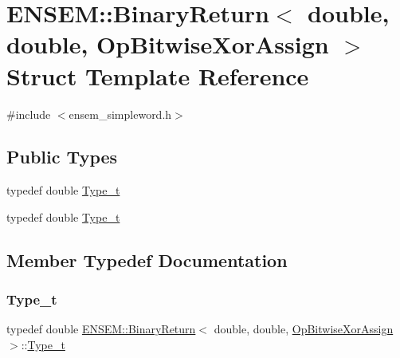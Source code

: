 \hypertarget{structENSEM_1_1BinaryReturn_3_01double_00_01double_00_01OpBitwiseXorAssign_01_4}{}\section{E\+N\+S\+EM\+:\+:Binary\+Return$<$ double, double, Op\+Bitwise\+Xor\+Assign $>$ Struct Template Reference}
\label{structENSEM_1_1BinaryReturn_3_01double_00_01double_00_01OpBitwiseXorAssign_01_4}


{\ttfamily \#include $<$ensem\+\_\+simpleword.\+h$>$}

\subsection*{Public Types}
\begin{DoxyCompactItemize}
\item 
typedef double \mbox{\hyperlink{structENSEM_1_1BinaryReturn_3_01double_00_01double_00_01OpBitwiseXorAssign_01_4_abd2a3f0619e394d328f98f130fc26e87}{Type\+\_\+t}}
\item 
typedef double \mbox{\hyperlink{structENSEM_1_1BinaryReturn_3_01double_00_01double_00_01OpBitwiseXorAssign_01_4_abd2a3f0619e394d328f98f130fc26e87}{Type\+\_\+t}}
\end{DoxyCompactItemize}


\subsection{Member Typedef Documentation}
\mbox{\label{structENSEM_1_1BinaryReturn_3_01double_00_01double_00_01OpBitwiseXorAssign_01_4_abd2a3f0619e394d328f98f130fc26e87}} 
\subsubsection{\texorpdfstring{Type\_t}{Type\_t}\hspace{0.1cm}{\footnotesize\ttfamily [1/2]}}
{\footnotesize\ttfamily typedef double \mbox{\hyperlink{structENSEM_1_1BinaryReturn}{E\+N\+S\+E\+M\+::\+Binary\+Return}}$<$ double, double, \mbox{\hyperlink{structENSEM_1_1OpBitwiseXorAssign}{Op\+Bitwise\+Xor\+Assign}} $>$\+::\mbox{\hyperlink{structENSEM_1_1BinaryReturn_3_01double_00_01double_00_01OpBitwiseXorAssign_01_4_abd2a3f0619e394d328f98f130fc26e87}{Type\+\_\+t}}}

